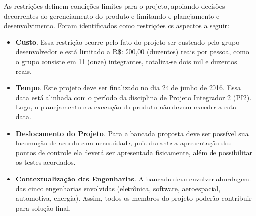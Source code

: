 		As restrições definem condições limites para o projeto, apoiando decisões decorrentes do gerenciamento do produto e limitando o planejamento e desenvolvimento. Foram identificados como restrições os aspectos a seguir:

		\begin{itemize}
			\item \textbf{Custo}. Essa restrição ocorre pelo fato do projeto ser custeado pelo grupo desenvolvedor e está limitado a R\$: 200,00 (duzentos) reais por pessoa, como o grupo consiste em 11 (onze) integrantes, totaliza-se dois mil e duzentos reais.
			\item \textbf{Tempo}. Este projeto deve ser finalizado no dia 24 de junho de 2016. Essa data está alinhada com o período da disciplina de Projeto Integrador 2 (PI2). Logo, o planejamento e a execução do produto não devem exceder a esta data.
			\item \textbf{Deslocamento do Projeto}. Para a bancada proposta deve ser possível sua locomoção de acordo com necessidade, pois durante a apresentação dos pontos de controle ela deverá ser apresentada fisicamente, além de possibilitar os testes acordados.
			\item \textbf{Contextualização das Engenharias}. A bancada deve envolver abordagens das cinco engenharias envolvidas (eletrônica, software, aeroespacial, automotiva, energia). Assim, todos os membros do projeto poderão contribuir para solução final.
		\end{itemize}
